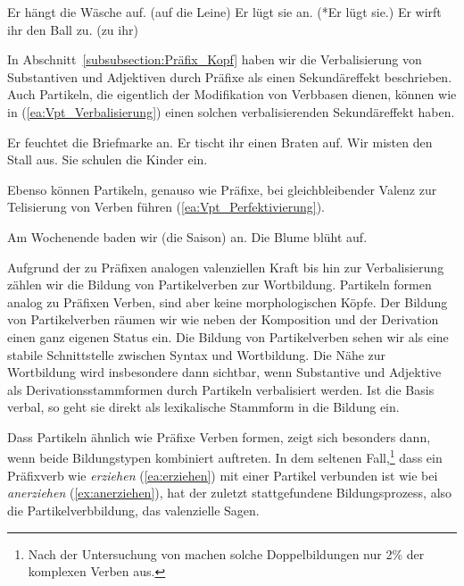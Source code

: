 \ea \label{ea:VPt_Valenzmacher}
\ea \label{ea:aufhängen} Er hängt die Wäsche auf. (auf die Leine)
\ex \label{ex:anlügen} Er lügt sie an. (*Er lügt sie.)
\ex \label{ex:zuwerfen} Er wirft ihr den Ball zu. (zu ihr)
\z 
\z 

In Abschnitt~\ref{subsubsection:Präfix_Kopf} haben wir die Verbalisierung von Substantiven und Adjektiven durch Präfixe als einen Sekundäreffekt beschrieben. Auch Partikeln, die eigentlich der Modifikation von Verbbasen dienen, können wie in (\ref{ea:Vpt_Verbalisierung}) einen solchen verbalisierenden Sekundäreffekt haben. 

\ea \label{ea:Vpt_Verbalisierung}
\ea \label{ea:ankreiden} Er feuchtet die Briefmarke an.
\ex \label{ex:auftischen} Er tischt ihr einen Braten auf.
\ex \label{ex:ausmisten} Wir misten den Stall aus.
\ex \label{ex:einschulen} Sie schulen die Kinder ein.
\z 
\z 

Ebenso können Partikeln, genauso wie Präfixe, bei gleichbleibender Valenz zur Telisierung von Verben führen (\ref{ea:Vpt_Perfektivierung}).

\ea \label{ea:Vpt_Perfektivierung}
\ea \label{ea:aufblühen} Am Wochenende baden wir (die Saison) an.
\ex \label{ex:aufblühen} Die Blume blüht auf.
\z 
\z 

Aufgrund der zu Präfixen analogen valenziellen Kraft bis hin zur Verbalisierung zählen wir die Bildung von Partikelverben zur Wortbildung. Partikeln formen analog zu Präfixen Verben, sind aber keine morphologischen Köpfe. Der Bildung von Partikelverben räumen wir wie \citet[1032]{Weinrich2003} neben der Komposition und der Derivation einen ganz eigenen Status ein. Die Bildung von Partikelverben sehen wir als eine stabile Schnittstelle zwischen Syntax und Wortbildung. Die Nähe zur Wortbildung wird insbesondere dann sichtbar, wenn Substantive und Adjektive als Derivationsstammformen durch Partikeln verbalisiert werden. Ist die Basis verbal, so geht sie direkt als lexikalische Stammform in die Bildung ein.

Dass Partikeln ähnlich wie Präfixe Verben formen, zeigt sich besonders dann, wenn beide Bildungstypen kombiniert auftreten. In dem seltenen Fall,\footnote{Nach der Untersuchung von \citet[143]{Kuehnhold1973} machen solche Doppelbildungen nur 2\% der komplexen Verben aus.} dass ein Präfixverb wie \textit{erziehen} (\ref{ea:erziehen}) mit einer Partikel verbunden ist wie bei \textit{anerziehen} (\ref{ex:anerziehen}), hat der zuletzt stattgefundene Bildungsprozess, also die Partikelverbbildung, das valenzielle Sagen.

